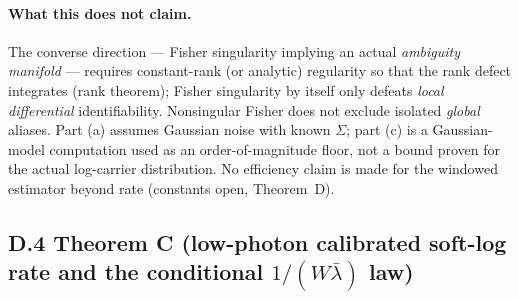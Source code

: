 \paragraph{What this does not claim.} The converse direction --- Fisher singularity implying an actual \emph{ambiguity manifold} --- requires constant-rank (or analytic) regularity so that the rank defect integrates (rank theorem); Fisher singularity by itself only defeats \emph{local differential} identifiability. Nonsingular Fisher does not exclude isolated \emph{global} aliases. Part (a) assumes Gaussian noise with known $\Sigma$; part (c) is a Gaussian-model computation used as an order-of-magnitude floor, not a bound proven for the actual log-carrier distribution. No efficiency claim is made for the windowed estimator beyond rate (constants open, Theorem~D).

\subsection{D.4 Theorem C (low-photon calibrated soft-log rate and the conditional \texorpdfstring{$1/(W\bar\lambda)$}{1/(W lambda-bar)} law)}

